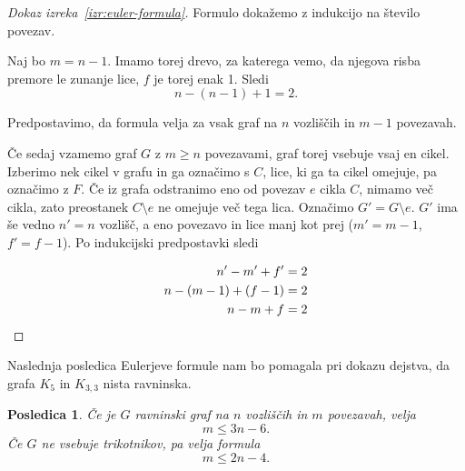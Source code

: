 \documentclass[12pt,a4paper]{amsart}
\theoremstyle{definition} %
\theoremstyle{plain} %
\newtheorem{posledica}[definicija]{Posledica}
\begin{document}
\begin{proof}[Dokaz izreka~\ref{izr:euler-formula}]
    Formulo dokažemo z indukcijo na število povezav.
    
    Naj bo $m = n-1$. Imamo torej drevo, za katerega vemo, da njegova risba premore le zunanje lice, $f$ je torej enak 1. Sledi
    \[ n - (n-1) + 1 = 2. \]
    
    Predpostavimo, da formula velja za vsak graf na $n$ vozliščih in $m-1$ povezavah.
    
    Če sedaj vzamemo graf $G$ z $m \geq n$ povezavami, graf torej vsebuje vsaj en cikel. Izberimo nek cikel v grafu in ga označimo s $C$, lice, ki ga ta cikel omejuje, pa označimo z $F$. Če iz grafa odstranimo eno od povezav $e$ cikla $C$, nimamo več cikla, zato preostanek $C \setminus e$ ne omejuje več tega lica. Označimo $G' = G \setminus e$. $G'$ ima še vedno $n'=n$ vozlišč, a eno povezavo in lice manj kot prej ($m'=m-1$, $f'=f-1$). Po indukcijski predpostavki sledi
    
    \begin{align*}
        n' - m' + f'      &= 2 \\
        n - (m-1) + (f-1) &= 2 \\
        n - m + f         &= 2 \qedhere
    \end{align*}
\end{proof}

Naslednja posledica Eulerjeve formule nam bo pomagala pri dokazu dejstva, da grafa $K_5$ in $K_{3,3}$ nista ravninska.

\begin{posledica}
    Če je $G$ ravninski graf na $n$ vozliščih in $m$ povezavah, velja
    \begin{equation} 
    \label{eq:posledica-euler-formula}
    m \leq 3n - 6.
    \end{equation}
    Če $G$ ne vsebuje trikotnikov, pa velja formula
    \begin{equation} 
    \label{eq:posledica-euler-formula-trik}
    m \leq 2n - 4.
    \end{equation}
\end{posledica}
\end{document}
